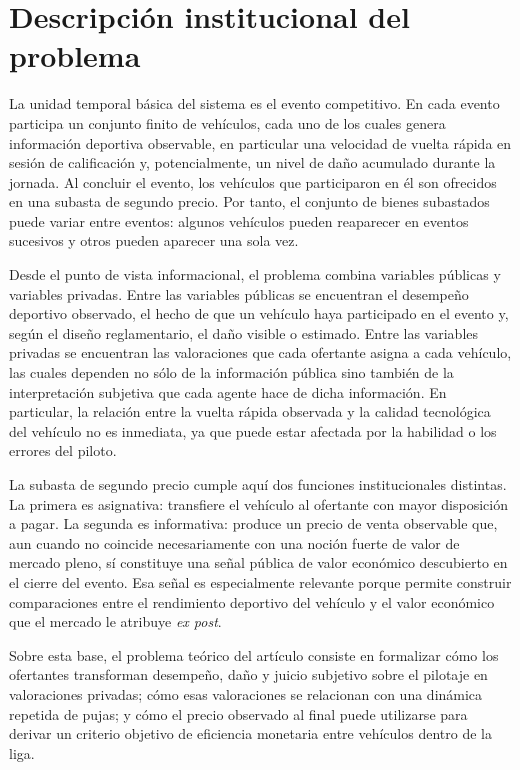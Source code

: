 \documentclass[11pt,a4paper]{article}
\theoremstyle{definition}
\begin{document}
\section{Descripción institucional del problema}

La unidad temporal básica del sistema es el evento competitivo. En cada evento participa un conjunto finito de vehículos, cada uno de los cuales genera información deportiva observable, en particular una velocidad de vuelta rápida en sesión de calificación y, potencialmente, un nivel de daño acumulado durante la jornada. Al concluir el evento, los vehículos que participaron en él son ofrecidos en una subasta de segundo precio. Por tanto, el conjunto de bienes subastados puede variar entre eventos: algunos vehículos pueden reaparecer en eventos sucesivos y otros pueden aparecer una sola vez.

Desde el punto de vista informacional, el problema combina variables públicas y variables privadas. Entre las variables públicas se encuentran el desempeño deportivo observado, el hecho de que un vehículo haya participado en el evento y, según el diseño reglamentario, el daño visible o estimado. Entre las variables privadas se encuentran las valoraciones que cada ofertante asigna a cada vehículo, las cuales dependen no sólo de la información pública sino también de la interpretación subjetiva que cada agente hace de dicha información. En particular, la relación entre la vuelta rápida observada y la calidad tecnológica del vehículo no es inmediata, ya que puede estar afectada por la habilidad o los errores del piloto.

La subasta de segundo precio cumple aquí dos funciones institucionales distintas. La primera es asignativa: transfiere el vehículo al ofertante con mayor disposición a pagar. La segunda es informativa: produce un precio de venta observable que, aun cuando no coincide necesariamente con una noción fuerte de valor de mercado pleno, sí constituye una señal pública de valor económico descubierto en el cierre del evento. Esa señal es especialmente relevante porque permite construir comparaciones entre el rendimiento deportivo del vehículo y el valor económico que el mercado le atribuye \emph{ex post}.

Sobre esta base, el problema teórico del artículo consiste en formalizar cómo los ofertantes transforman desempeño, daño y juicio subjetivo sobre el pilotaje en valoraciones privadas; cómo esas valoraciones se relacionan con una dinámica repetida de pujas; y cómo el precio observado al final puede utilizarse para derivar un criterio objetivo de eficiencia monetaria entre vehículos dentro de la liga.
\end{document}

